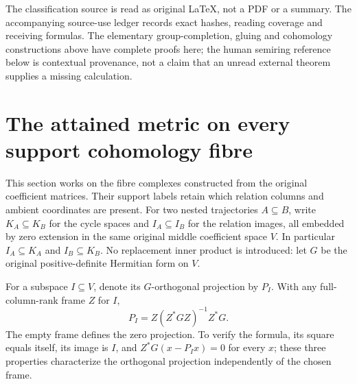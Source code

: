 \documentclass[11pt,a4paper]{article}
\theoremstyle{definition}\newtheorem{definition}[theorem]{Definition}
\begin{document}
The classification source is read as original LaTeX, not a PDF or
a summary. The accompanying source-use ledger records exact hashes,
reading coverage and receiving formulas. The elementary group-completion,
gluing and cohomology constructions above have complete proofs here;
the human semiring reference below is contextual provenance, not a
claim that an unread external theorem supplies a missing calculation.


\section{The attained metric on every support cohomology fibre}
\label{sec:support-quotient-metric}
This section works on the fibre complexes constructed from the original coefficient matrices. Their support labels retain which relation columns and ambient coordinates are present. For two nested trajectories $A\subseteq B$, write $K_A\subseteq K_B$ for the cycle spaces and $I_A\subseteq I_B$ for the relation images, all embedded by zero extension in the same original middle coefficient space $V$. In particular $I_A\subseteq K_A$ and $I_B\subseteq K_B$. No replacement inner product is introduced: let $G$ be the original positive-definite Hermitian form on $V$.

For a subspace $I\subseteq V$, denote its $G$-orthogonal projection by $P_I$. With any full-column-rank frame $Z$ for $I$,
\begin{equation}\label{eq:original-relation-projection}
 P_I=Z(Z^*GZ)^{-1}Z^*G.
\end{equation}
The empty frame defines the zero projection. To verify the formula, its square equals itself, its image is $I$, and $Z^*G(x-P_Ix)=0$ for every $x$; these three properties characterize the orthogonal projection independently of the chosen frame.
\end{document}
